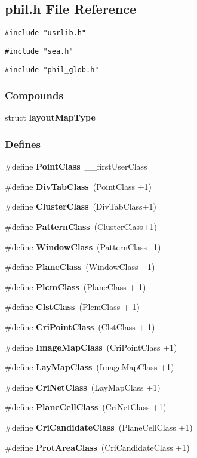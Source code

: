 \subsection{phil.h File Reference}
\label{phil.h}
{\tt \#include "usrlib.h"}\par
{\tt \#include "sea.h"}\par
{\tt \#include "phil\_\-glob.h"}\par
\subsubsection*{Compounds}
\begin{CompactItemize}
\item 
struct {\bf layout\-Map\-Type}
\end{CompactItemize}
\subsubsection*{Defines}
\begin{CompactItemize}
\item 
\#define {\bf Point\-Class}\ \_\-\_\-first\-User\-Class
\item 
\#define {\bf Div\-Tab\-Class}\ (Point\-Class +1)
\item 
\#define {\bf Cluster\-Class}\ (Div\-Tab\-Class+1)
\item 
\#define {\bf Pattern\-Class}\ (Cluster\-Class+1)
\item 
\#define {\bf Window\-Class}\ (Pattern\-Class+1)
\item 
\#define {\bf Plane\-Class}\ (Window\-Class +1)
\item 
\#define {\bf Plcm\-Class}\ (Plane\-Class + 1)
\item 
\#define {\bf Clst\-Class}\ (Plcm\-Class + 1)
\item 
\#define {\bf Cri\-Point\-Class}\ (Clst\-Class + 1)
\item 
\#define {\bf Image\-Map\-Class}\ (Cri\-Point\-Class +1)
\item 
\#define {\bf Lay\-Map\-Class}\ (Image\-Map\-Class +1)
\item 
\#define {\bf Cri\-Net\-Class}\ (Lay\-Map\-Class +1)
\item 
\#define {\bf Plane\-Cell\-Class}\ (Cri\-Net\-Class +1)
\item 
\#define {\bf Cri\-Candidate\-Class}\ (Plane\-Cell\-Class +1)
\item 
\#define {\bf Prot\-Area\-Class}\ (Cri\-Candidate\-Class +1)
\end{CompactItemize}
